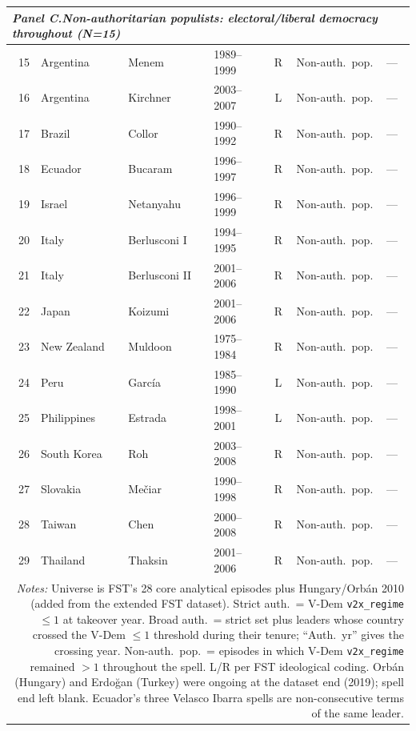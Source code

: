 {\begin{longtable}{r p{2.0cm} p{3.0cm} p{1.5cm} c p{2.4cm} p{1.3cm}}
\hline
\multicolumn{7}{l}{\textit{Panel C.\enspace Non-authoritarian populists: electoral/liberal democracy throughout (N=15)}}\\
\hline
15 & Argentina  & Menem                & 1989--1999 & R & Non-auth.\ pop. & --- \\
16 & Argentina  & Kirchner             & 2003--2007 & L & Non-auth.\ pop. & --- \\
17 & Brazil     & Collor               & 1990--1992 & R & Non-auth.\ pop. & --- \\
18 & Ecuador    & Bucaram              & 1996--1997 & R & Non-auth.\ pop. & --- \\
19 & Israel     & Netanyahu            & 1996--1999 & R & Non-auth.\ pop. & --- \\
20 & Italy      & Berlusconi I         & 1994--1995 & R & Non-auth.\ pop. & --- \\
21 & Italy      & Berlusconi II        & 2001--2006 & R & Non-auth.\ pop. & --- \\
22 & Japan      & Koizumi              & 2001--2006 & R & Non-auth.\ pop. & --- \\
23 & New Zealand & Muldoon             & 1975--1984 & R & Non-auth.\ pop. & --- \\
24 & Peru       & Garc\'ia             & 1985--1990 & L & Non-auth.\ pop. & --- \\
25 & Philippines & Estrada             & 1998--2001 & L & Non-auth.\ pop. & --- \\
26 & South Korea & Roh                 & 2003--2008 & R & Non-auth.\ pop. & --- \\
27 & Slovakia   & Me\v{c}iar           & 1990--1998 & R & Non-auth.\ pop. & --- \\
28 & Taiwan     & Chen                 & 2000--2008 & R & Non-auth.\ pop. & --- \\
29 & Thailand   & Thaksin              & 2001--2006 & R & Non-auth.\ pop. & --- \\
\hline\hline
\multicolumn{7}{p{14cm}}{\textit{Notes:} Universe is FST's 28 core analytical episodes plus Hungary/Orb\'an 2010 (added from the extended FST dataset). Strict auth.\ = V-Dem \texttt{v2x\_regime} $\leq 1$ at takeover year. Broad auth.\ = strict set plus leaders whose country crossed the V-Dem $\leq 1$ threshold during their tenure; ``Auth.\ yr'' gives the crossing year. Non-auth.\ pop.\ = episodes in which V-Dem \texttt{v2x\_regime} remained $> 1$ throughout the spell. L/R per FST ideological coding. Orbán (Hungary) and Erdoğan (Turkey) were ongoing at the dataset end (2019); spell end left blank. Ecuador's three Velasco Ibarra spells are non-consecutive terms of the same leader.}\\
\end{longtable}
}
